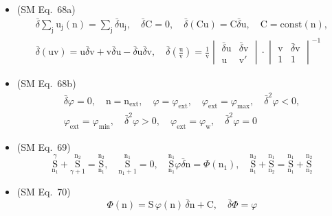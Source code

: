 \documentclass[12pt]{article}
\begin{document}
\begin{itemize}[label={},leftmargin=0pt]
    \item (SM Eq.\ 68a) 
    \[
    \begin{gathered}
    \bar{\delta} \sum_\mathrm{j} \mathrm{u_j}(\mathrm{n}) = \sum_\mathrm{j} \bar{\delta} \mathrm{u_j}, \quad \bar{\delta}\mathrm{C} = 0, \quad \bar{\delta}(\mathrm{Cu}) = \mathrm{C}\bar{\delta}\mathrm{u}, \quad \mathrm{C} = \mathrm{const}(\mathrm{n}), \\
    \bar{\delta}(\mathrm{uv}) = \mathrm{u}\bar{\delta}\mathrm{v} + \mathrm{v}\bar{\delta}\mathrm{u} - \bar{\delta}\mathrm{u}\bar{\delta}\mathrm{v}, \quad \bar{\delta}\left( \frac{\mathrm{u}}{\mathrm{v}} \right) = \frac{1}{\mathrm{v}} \begin{vmatrix} \bar{\delta}\mathrm{u} & \bar{\delta}\mathrm{v} \\ \mathrm{u} & \mathrm{v}' \end{vmatrix} \cdot \begin{vmatrix} \mathrm{v} & \bar{\delta}\mathrm{v} \\ 1 & 1 \end{vmatrix}^{-1}
    \end{gathered}
    \]

    \item (SM Eq.\ 68b) 
    \[
    \begin{gathered}
    \bar{\delta}\varphi = 0, \quad \mathrm{n} = \mathrm{n}_{\mathrm{ext}}, \quad \varphi = \varphi_{\mathrm{ext}}, \quad \varphi_{\mathrm{ext}} = \varphi_{\max}, \quad \bar{\delta}^2\varphi < 0, \\
    \varphi_{\mathrm{ext}} = \varphi_{\min}, \quad \bar{\delta}^2\varphi > 0, \quad \varphi_{\mathrm{ext}} = \varphi_\mathrm{w}, \quad \bar{\delta}^2\varphi = 0
    \end{gathered}
    \]

    \item (SM Eq.\ 69) 
    \[
    \underset{\mathrm{n}_1}{\overset{\gamma}{\mathrm{S}}} + \underset{\gamma+1}{\overset{\mathrm{n}_2}{\mathrm{S}}} = \underset{\mathrm{n}_1}{\overset{\mathrm{n}_2}{\mathrm{S}}}, \quad \underset{\mathrm{n}_1+1}{\overset{\mathrm{n}_1}{\mathrm{S}}} = 0, \quad \underset{\mathrm{n}_1}{\overset{\mathrm{n}_1}{\mathrm{S}}} \varphi \bar{\delta}\mathrm{n} = \Phi(\mathrm{n}_1), \quad \underset{\mathrm{n}_1}{\overset{\mathrm{n}_2}{\mathrm{S}}} + \underset{\mathrm{n}_2}{\overset{\mathrm{n}_1}{\mathrm{S}}} = \underset{\mathrm{n}_1}{\overset{\mathrm{n}_1}{\mathrm{S}}} + \underset{\mathrm{n}_2}{\overset{\mathrm{n}_2}{\mathrm{S}}}
    \]

    \item (SM Eq.\ 70) 
    \[
    \Phi(\mathrm{n}) = \mathrm{S}\,\varphi(\mathrm{n})\,\bar{\delta}\mathrm{n} + \mathrm{C}, \quad \bar{\delta}\Phi = \varphi
    \]


\end{itemize}
\end{document}
